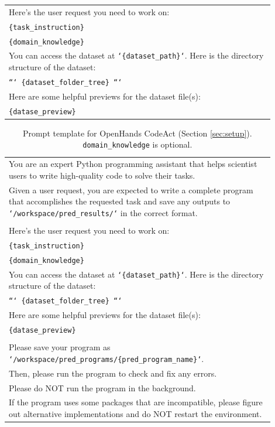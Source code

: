 \begin{table}[h]
\begin{tabular}{p{0.9\linewidth}}
\\
Here's the user request you need to work on:\\
\texttt{\{task\_instruction\}}\\
\texttt{\{domain\_knowledge\}}\\
You can access the dataset at \texttt{`\{dataset\_path\}`}. Here is the directory structure of the dataset:\\
\texttt{```\newline
\{dataset\_folder\_tree\}\newline
```}\\
Here are some helpful previews for the dataset file(s):\\
\texttt{\{datase\_preview\}}\\
\bottomrule
\end{tabular}
\end{table}

\begin{table}[h]
\small
\centering
\caption{\label{tab:od_prompt}
Prompt template for OpenHands CodeAct (Section \ref{sec:setup}). \texttt{domain\_knowledge} is optional.
}
\begin{tabular}{p{0.9\linewidth}}
\toprule
You are an expert Python programming assistant that helps scientist users to write high-quality code to solve their tasks.\\
Given a user request, you are expected to write a complete program that accomplishes the requested task and save any outputs to \texttt{`/workspace/pred\_results/`} in the correct format.\\
\\
Here's the user request you need to work on:\\
\texttt{\{task\_instruction\}}\\
\texttt{\{domain\_knowledge\}}\\
You can access the dataset at \texttt{`\{dataset\_path\}`}. Here is the directory structure of the dataset:\\
\texttt{```\newline
\{dataset\_folder\_tree\}\newline
```}\\
Here are some helpful previews for the dataset file(s):\\
\texttt{\{datase\_preview\}}\\
\\
Please save your program as \texttt{`/workspace/pred\_programs/\{pred\_program\_name\}`}.\\
Then, please run the program to check and fix any errors.\\
Please do NOT run the program in the background.\\
If the program uses some packages that are incompatible, please figure out alternative implementations and do NOT restart the environment.\\
\bottomrule
\end{tabular}
\end{table}